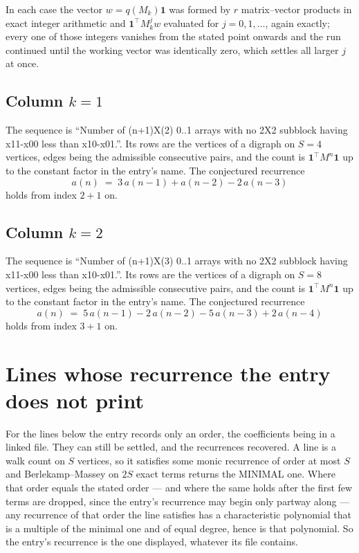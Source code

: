 \documentclass[11pt,a4paper]{article}
\theoremstyle{plain}
\theoremstyle{definition}
\begin{document}
In each case the vector $w=q(M_k)\mathbf{1}$ was formed by $r$ matrix--vector products in
exact integer arithmetic and $\mathbf{1}^{\!\top}M_k^{j}w$ evaluated for $j=0,1,\dots$,
again exactly; every one of those integers vanishes from the stated point onwards and the run
continued until the working vector was identically zero, which settles all larger $j$ at once.

\subsection*{Column $k$$=1$}
The sequence is ``Number of (n+1)X(2) 0..1 arrays with no 2X2 subblock having x11-x00 less than x10-x01.''. Its rows are the vertices of a digraph on
$S=4$ vertices, edges being the admissible consecutive pairs, and the count is
$\mathbf{1}^{\!\top}M^{n}\mathbf{1}$ up to the constant factor in the entry's name.
The conjectured recurrence
\[
a(n)\;=\;3\,a(n-1) + a(n-2) - 2\,a(n-3)
\]
holds from index $2+1$ on.

\subsection*{Column $k$$=2$}
The sequence is ``Number of (n+1)X(3) 0..1 arrays with no 2X2 subblock having x11-x00 less than x10-x01.''. Its rows are the vertices of a digraph on
$S=8$ vertices, edges being the admissible consecutive pairs, and the count is
$\mathbf{1}^{\!\top}M^{n}\mathbf{1}$ up to the constant factor in the entry's name.
The conjectured recurrence
\[
a(n)\;=\;5\,a(n-1) - 2\,a(n-2) - 5\,a(n-3) + 2\,a(n-4)
\]
holds from index $3+1$ on.


\section{Lines whose recurrence the entry does not print}

For the lines below the entry records only an order, the coefficients being in a linked file.
They can still be settled, and the recurrences recovered. A line is a walk count on $S$
vertices, so it satisfies some monic recurrence of order at most $S$ and Berlekamp--Massey on
$2S$ exact terms returns the MINIMAL one. Where that order equals the stated order --- and
where the same holds after the first few terms are dropped, since the entry's recurrence may
begin only partway along --- any recurrence of that order the line satisfies has a
characteristic polynomial that is a multiple of the minimal one and of equal degree, hence is
that polynomial. So the entry's recurrence is the one displayed, whatever its file contains.
\end{document}
